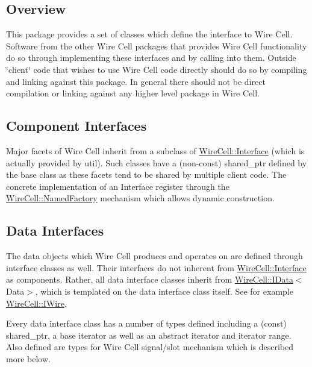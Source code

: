 \subsection*{Overview }

This package provides a set of classes which define the interface to Wire Cell. Software from the other Wire Cell packages that provides Wire Cell functionality do so through implementing these interfaces and by calling into them. Outside \char`\"{}client\char`\"{} code that wishes to use Wire Cell code directly should do so by compiling and linking against this package. In general there should not be direct compilation or linking against any higher level package in Wire Cell.

\subsection*{Component Interfaces }

Major facets of Wire Cell inherit from a subclass of {\ttfamily \hyperlink{class_wire_cell_1_1_interface}{Wire\+Cell\+::\+Interface}} (which is actually provided by {\ttfamily util}). Such classes have a (non-\/const) {\ttfamily shared\+\_\+ptr} defined by the base class as these facets tend to be shared by multiple client code. The concrete implementation of an Interface register through the {\ttfamily \hyperlink{class_wire_cell_1_1_named_factory}{Wire\+Cell\+::\+Named\+Factory}} mechanism which allows dynamic construction.

\subsection*{Data Interfaces }

The data objects which Wire Cell produces and operates on are defined through interface classes as well. Their interfaces do not inherent from {\ttfamily \hyperlink{class_wire_cell_1_1_interface}{Wire\+Cell\+::\+Interface}} as components. Rather, all data interface classes inherit from {\ttfamily \hyperlink{class_wire_cell_1_1_i_data}{Wire\+Cell\+::\+I\+Data}$<$Data$>$}, which is templated on the data interface class itself. See for example {\ttfamily \hyperlink{class_wire_cell_1_1_i_wire}{Wire\+Cell\+::\+I\+Wire}}.

Every data interface class has a number of types defined including a (const) {\ttfamily shared\+\_\+ptr}, a base iterator as well as an abstract iterator and iterator range. Also defined are types for Wire Cell signal/slot mechanism which is described more below.

